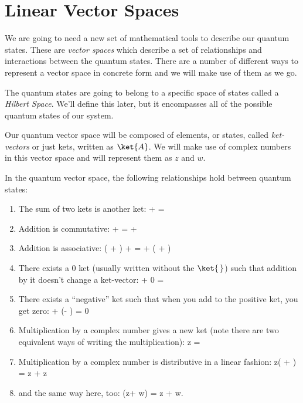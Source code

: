 \section{Linear Vector Spaces}
We are going to need a new set of mathematical tools to describe our quantum states. These are {\em vector spaces} which describe a set of relationships and interactions between the quantum states.  There are a number of different ways to represent a vector space in concrete form and we will make use of them as we go.

The quantum states are going to belong to a specific space of states called a {\em Hilbert Space}. We'll define this later, but it encompasses all of the possible quantum states of our system.

Our quantum vector space will be composed of elements, or states, called {\em ket-vectors} or just kets, written as $\ket{A}$. We will make use of complex numbers in this vector space and will represent them as $z$ and $w$.

In the quantum vector space, the following relationships hold between quantum states:
\begin{enumerate}
\item The sum of two kets is another ket:
\beq
{} +  = 
\eeq
\item Addition is commutative:
\beq
{} +  =  + 
\eeq
\item Addition is associative:
\beq
\left( + \right) + =  + \left( +   \right)
\eeq
\item There exists a $0$ ket (usually written without the $\ket{\,}$) such that addition by it doesn't change a ket-vector:
\beq
{} + 0 = 
\eeq
\item There exists a ``negative'' ket such that when you add to the positive ket, you get zero:
\beq
{} + \left({-} \right) = 0
\eeq
\item Multiplication by a complex number gives a new ket (note there are two equivalent ways of writing the multiplication):
\beq
z \equiv {} = 
\eeq
\item Multiplication by a complex number is distributive in a linear fashion:
\beq
z\left( +   \right) = z + z
\eeq
\item and the same way here, too:
\beq
(z+ w) = z + w.
\eeq
\end{enumerate}


